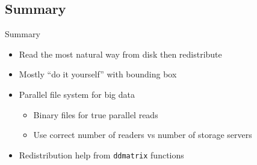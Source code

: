 \subsection{Summary}
\makesubcontentsslidessec


\begin{frame}
  \begin{block}{Summary}
    \begin{itemize}
    \item Read the most natural way from disk then redistribute
    \item Mostly ``do it yourself'' with bounding box
    \item Parallel file system for big data
      \begin{itemize}
      \item Binary files for true parallel reads
      \item Use correct number of readers vs number of storage servers
      \end{itemize}
    \item Redistribution help from {\tt ddmatrix} functions
    \end{itemize}
  \end{block}
\end{frame}